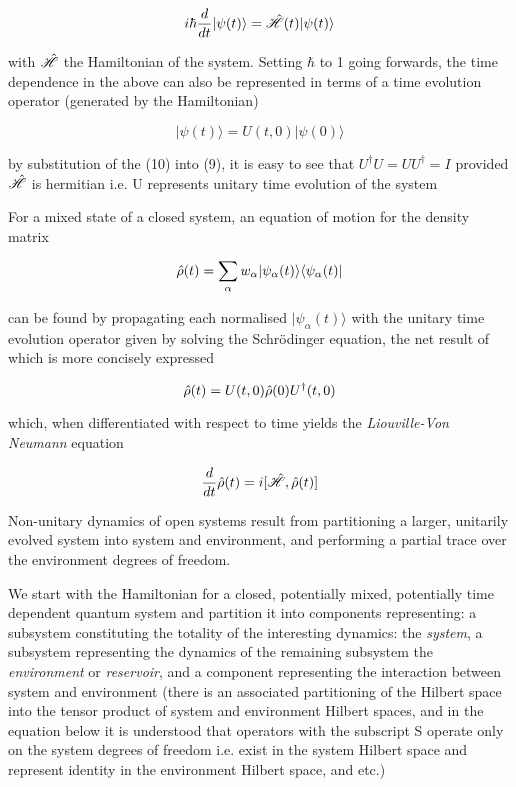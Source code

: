 \begin{equation}
	i\hbar \frac{d}{dt} |\psi(t)\rangle = \hat{\mathscr{H}}(t) |\psi(t) \rangle
\end{equation}

with $\hat{\mathscr{H}}$ the Hamiltonian of the system.
Setting $\hbar$ to 1 going forwards, the time dependence in the above can also be represented in terms of a time evolution operator (generated by the Hamiltonian)

\begin{equation}
	|\psi(t) \rangle = U(t, 0) | \psi(0) \rangle
\end{equation}

by substitution of the (10) into (9), it is easy to see that $U^{\dagger}U = UU^\dagger = I$ provided $\hat{\mathscr{H}}$ is hermitian i.e. U represents unitary time evolution of the system

For a mixed state of a closed system, an equation of motion for the density matrix

\begin{equation}
	\hat{\rho} (t) = \sum_\alpha w_{\alpha} |\psi_\alpha (t) \rangle \langle \psi_\alpha (t) |
\end{equation}

can be found by propagating each normalised $| \psi_\alpha (t) \rangle$ with the unitary time evolution operator given by solving the Schr\"odinger equation, the net result of which is more concisely expressed

\begin{equation}
	\hat{\rho} (t) = U(t, 0)\hat{\rho} (0) U^\dagger (t, 0)
\end{equation}

which, when differentiated with respect to time yields the \emph{Liouville-Von Neumann} equation

\begin{equation}
	\frac{d}{dt}\hat{\rho}(t) = i [\hat{\mathscr{H}}, \hat{\rho} (t) ]
\end{equation}

Non-unitary dynamics of open systems result from partitioning a larger, unitarily evolved system into system and environment, and performing a partial trace over the environment degrees of freedom.

We start with the Hamiltonian for a closed, potentially mixed, potentially time dependent quantum system and partition it into components representing: a subsystem constituting the totality of the interesting dynamics: the \emph{system}, a subsystem representing the dynamics of the remaining subsystem the \emph{environment} or \emph{reservoir}, and a component representing the interaction between system and environment (there is an associated partitioning of the Hilbert space into the tensor product of system and environment Hilbert spaces, and in the equation below it is understood that operators with the subscript S operate only on the system degrees of freedom i.e. exist in the system Hilbert space and represent identity in the environment Hilbert space, and etc.)

